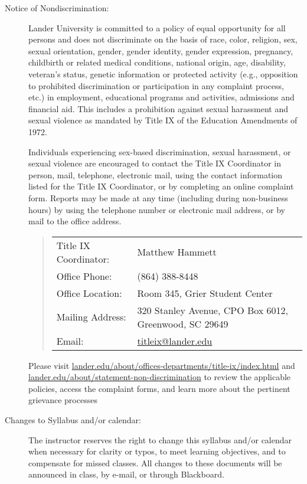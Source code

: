 \documentclass{article}
\begin{document}
\begin{description}
\item[Notice of Nondiscrimination:]

  Lander University is committed to a policy of equal opportunity for all persons and does not discriminate on the basis of race, color, religion, sex, sexual orientation, gender, gender identity, gender expression, pregnancy, childbirth or related medical conditions, national origin, age, disability, veteran’s status, genetic information or protected activity (e.g., opposition to prohibited discrimination or participation in any complaint process, etc.) in employment, educational programs and activities, admissions and financial aid. This includes a prohibition against sexual harassment and sexual violence as mandated by Title IX of the Education Amendments of 1972.

  Individuals experiencing sex-based discrimination, sexual harassment, or sexual violence are encouraged to contact the Title IX Coordinator in person, mail, telephone, electronic mail, using the contact information listed for the Title IX Coordinator, or by completing an online complaint form. Reports may be made at any time (including during non-business hours) by using the telephone number or electronic mail address, or by mail to the office address.

\begin{quote}
  \begin{tabular}{@{}ll@{}}
    Title IX Coordinator: & Matthew Hammett\\
    Office Phone: & (864) 388-8448\\
    Office Location: & Room 345, Grier Student Center\\
    Mailing Address: & 320 Stanley Avenue, CPO Box 6012, Greenwood, SC 29649\\
    Email: & \href{mailto:titleix@lander.edu}{titleix@lander.edu}
  \end{tabular}
\end{quote}

  Please visit \href{https://www.lander.edu/about/offices-departments/title-ix/index.html}{lander.edu/about/offices-departments/title-ix/index.html} and \href{https://www.lander.edu/about/statement-non-discrimination}{lander.edu/about/\allowbreak statement\allowbreak -non\allowbreak -discrimination} to review the applicable policies, access the complaint forms, and learn more about the pertinent grievance processes

\item[Changes to Syllabus and/or calendar:]
  The instructor reserves the right to change this syllabus and/or calendar when necessary for clarity or typos, to meet learning objectives, and to compensate for missed classes. All changes to these documents will be announced in class, by e-mail, or through Blackboard.

  \end{description}
\end{document}
